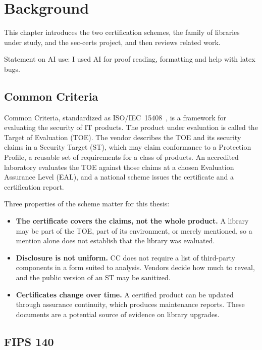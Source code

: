 \chapter{Background}
\label{ch:background}

This chapter introduces the two certification schemes, the family of
libraries under study, and the sec-certs project, and then reviews related
work.

Statement on AI use: I used AI for proof reading, formatting and help with latex bugs.

\section{Common Criteria}
\label{sec:cc}

Common Criteria, standardized as ISO/IEC~15408~\cite{iso15408}, is a
framework for evaluating the security of IT products. The product under
evaluation is called the Target of Evaluation (TOE). The vendor describes
the TOE and its security claims in a Security Target (ST), which may claim
conformance to a Protection Profile, a reusable set of requirements for a
class of products. An accredited laboratory evaluates the TOE against those
claims at a chosen Evaluation Assurance Level (EAL), and a national scheme
issues the certificate and a certification report.

Three properties of the scheme matter for this thesis:

\begin{itemize}
  \item \textbf{The certificate covers the claims, not the whole product.}
    A library may be part of the TOE, part of its environment, or merely
    mentioned, so a mention alone does not establish that the library was
    evaluated.
  \item \textbf{Disclosure is not uniform.} CC does not require a list of
    third-party components in a form suited to analysis. Vendors decide how
    much to reveal, and the public version of an ST may be sanitized.
  \item \textbf{Certificates change over time.} A certified product can be
    updated through assurance continuity, which produces maintenance
    reports. These documents are a potential source of evidence on library
    upgrades.
\end{itemize}



\section{FIPS 140}
\label{sec:fips}

